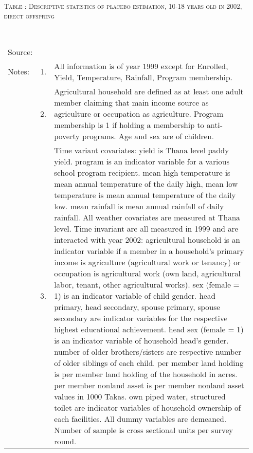 \begin{minipage}[t]{14cm}
\hfil\textsc{\normalsize Table \thetable: Descriptive statistics of placebo estimation, 10-18 years old in 2002, direct offspring\label{tab destat zEp2002}}\\
\setlength{\tabcolsep}{1pt}
\renewcommand{\arraystretch}{.8}
\hfil{}\\
\renewcommand{\arraystretch}{.8}
\setlength{\tabcolsep}{1pt}
\begin{tabular}{>{\hfill\scriptsize}p{1cm}<{}>{\hfill\scriptsize}p{.25cm}<{}>{\scriptsize}p{12cm}<{\hfill}}
Source:& \multicolumn{2}{l}{\scriptsize Compiled from IFPRI data.}\\
Notes: & 1. & All information is of year 1999 except for \textsf{Enrolled, Yield, Temperature, Rainfall, Program membership}.\\
& 2. & Agricultural household are defined as at least one adult member claiming that main income source as agriculture or occupation as agriculture. Program membership is 1 if holding a membership to anti-poverty programs. Age and sex are of children.\\
& 3. & Time variant covariates: \textsf{yield} is Thana level paddy yield. \textsf{program} is an indicator variable for a various school program recipient. \textsf{mean high temperature} is mean annual temperature of the daily high, \textsf{mean low temperature} is mean annual temperature of the daily low. \textsf{mean rainfall} is mean annual rainfall of daily rainfall. All weather covariates are measured at Thana level. Time invariant are all measured in 1999 and are interacted with year 2002: \textsf{agricultural household} is an indicator variable if a member in a household's primary income is agriculture (agricultural work or tenancy) or occupation is agricultural work (own land, agricultural labor, tenant, other agricultural works). \textsf{sex (female = 1)} is an indicator variable of child gender. \textsf{head primary, head secondary, spouse primary, spouse secondary} are indicator variables for the respective highest educational achievement. \textsf{head sex (female = 1)} is an indicator variable of household head's gender. \textsf{number of older brothers/sisters} are respective number of older siblings of each child. \textsf{per member land holding} is per member land holding of the household in acres. \textsf{per member nonland asset} is per member nonland asset values in 1000 Takas. \textsf{own piped water, structured toilet} are indicator variables of household ownership of each facilities. All dummy variables are demeaned. Number of sample is cross sectional units per survey round. 
\end{tabular}
\end{minipage}\\ \vspace{2ex}

